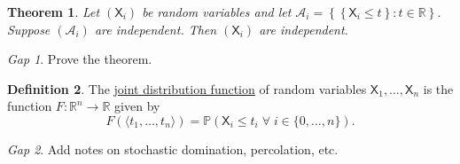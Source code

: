 \documentclass[11pt]{article}
\newcommand{\col}[1]{\mathscr{#1}}
\newcommand{\rv}[1]{\mathsf{#1}}
\newcommand{\p}{\mathbb{P}}
\newcommand{\defname}[1]{\underline{#1}}
\newcommand{\RR}{\mathbb{R}}
\theoremstyle{theorem}
\newtheorem{theorem}{Theorem}[section]
\theoremstyle{definition}
\newtheorem{definition}[theorem]{Definition}
\theoremstyle{remark}
\theoremstyle{step}
\theoremstyle{gap}
\newtheorem*{gap}{Gap}
\begin{document}
\begin{theorem}
Let \((\rv{X}_i)\) be random variables and let \(\col{A}_i = \left\{\left\{\rv{X}_i \leq t\right\} : t \in \RR\right\}\). Suppose \((\col{A}_i)\) are independent. Then \((\rv{X}_i)\) are independent.
\end{theorem}

\begin{gap}
Prove the theorem.
\end{gap}

\begin{definition}
The \defname{joint distribution function} of random variables \(\rv{X}_1, \ldots, \rv{X}_n\) is the function \(F:\RR^n \to \RR\) given by \[F\left(\langle t_1, \ldots, t_n\rangle\right) = \p \left(\rv{X}_i \leq t_i \;\forall\; i \in \{0, \ldots, n\}\right).\]
\end{definition}


\begin{gap}
Add notes on stochastic domination, percolation, etc.
\end{gap}
\end{document}
